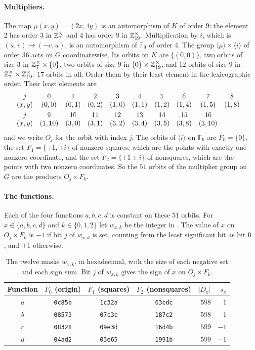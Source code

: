\documentclass[11pt,colorlinks]{charlie}
\newcommand{\F}{\mathbb{F}}
\begin{document}
\paragraph{Multipliers.}
The map $\mu(x,y)=(2x,4y)$ is an automorphism of $K$ of order $9$: the element $2$ has order $3$ in $\mathbb{Z}_7^\times$ and $4$ has order $9$ in $\mathbb{Z}_{19}^\times$. Multiplication by $i$, which is $(u,v)\mapsto(-v,u)$, is an automorphism of $\F_9$ of order $4$. The group $\langle\mu\rangle\times\langle i\rangle$ of order $36$ acts on $G$ coordinatewise. Its orbits on $K$ are $\{(0,0)\}$, two orbits of size $3$ in $\mathbb{Z}_7^\times\times\{0\}$, two orbits of size $9$ in $\{0\}\times\mathbb{Z}_{19}^\times$, and $12$ orbits of size $9$ in $\mathbb{Z}_7^\times\times\mathbb{Z}_{19}^\times$: $17$ orbits in all. Order them by their least element in the lexicographic order. Their least elements are
\[
\begin{array}{c@{\quad}ccccccccc}
j&0&1&2&3&4&5&6&7&8\\
(x,y)&(0,0)&(0,1)&(0,2)&(1,0)&(1,1)&(1,2)&(1,4)&(1,5)&(1,8)\\[3pt]
j&9&10&11&12&13&14&15&16\\
(x,y)&(1,10)&(3,0)&(3,1)&(3,2)&(3,4)&(3,5)&(3,8)&(3,10)
\end{array}
\]
and we write $O_j$ for the orbit with index $j$. The orbits of $\langle i\rangle$ on $\F_9$ are $F_0=\{0\}$, the set $F_1=\{\pm1,\pm i\}$ of nonzero squares, which are the points with exactly one nonzero coordinate, and the set $F_2=\{\pm1\pm i\}$ of nonsquares, which are the points with two nonzero coordinates. So the $51$ orbits of the multiplier group on $G$ are the products $O_j\times F_k$.

\paragraph{The functions.}
Each of the four functions $a,b,c,d$ is constant on these $51$ orbits. For $x\in\{a,b,c,d\}$ and $k\in\{0,1,2\}$ let $w_{x,k}$ be the integer in . The value of $x$ on $O_j\times F_k$ is $-1$ if bit $j$ of $w_{x,k}$ is set, counting from the least significant bit as bit $0$, and $+1$ otherwise.

\begin{table}[ht]
\centering
\begin{tabular}{@{}ccccrr@{}}
\toprule
Function & $F_0$ (origin) & $F_1$ (squares) & $F_2$ (nonsquares) & $|D_x|$ & $s_x$ \\
\midrule
$a$ & \texttt{0c85b} & \texttt{1c32a} & \texttt{03cdc} & $598$ & $1$ \\
$b$ & \texttt{08573} & \texttt{07c3c} & \texttt{187c2} & $598$ & $1$ \\
$c$ & \texttt{08328} & \texttt{09e3d} & \texttt{16d4b} & $599$ & $-1$ \\
$d$ & \texttt{04ad2} & \texttt{03e65} & \texttt{1991b} & $599$ & $-1$ \\
\bottomrule
\end{tabular}
\caption{The twelve masks $w_{x,k}$, in hexadecimal, with the size of each negative set and each sign sum. Bit $j$ of $w_{x,k}$ gives the sign of $x$ on $O_j\times F_k$.}
\label{tab:masks}
\end{table}
\end{document}
